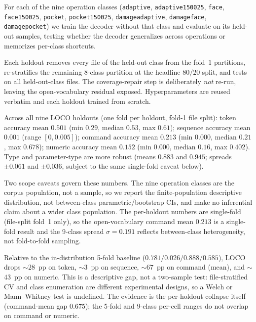 \documentclass[sensors,article,submit,moreauthors,pdftex]{Definitions/mdpi}
\begin{document}
For each of the nine operation classes (\texttt{adaptive}, \texttt{adaptive150025}, \texttt{face}, \texttt{face150025}, \texttt{pocket}, \texttt{pocket150025}, \texttt{damageadaptive}, \texttt{damageface}, \texttt{damagepocket}) we train the decoder without that class and evaluate on its held-out samples, testing whether the decoder generalizes across operations or memorizes per-class shortcuts.

Each holdout removes every file of the held-out class from the fold~1 partitions, re-stratifies the remaining $8$-class partition at the headline $80/20$ split, and tests on all held-out-class files. The coverage-repair step is deliberately \emph{not} re-run, leaving the open-vocabulary residual exposed. Hyperparameters are reused verbatim and each holdout trained from scratch.

Across all nine LOCO holdouts (one fold per holdout, fold-1 file split): token accuracy mean $0.501$ (min $0.29$, median $0.53$, max $0.61$); sequence accuracy mean $0.001$ (range $[0, 0.005]$); command accuracy mean $0.213$ (min $0.000$, median $0.21$, max $0.678$); numeric accuracy mean $0.152$ (min $0.000$, median $0.16$, max $0.402$). Type and parameter-type are more robust (means $0.883$ and $0.945$; spreads $\pm 0.061$ and $\pm 0.036$, subject to the same single-fold caveat below).

Two scope caveats govern these numbers. The nine operation classes are the corpus population, not a sample, so we report the finite-population descriptive distribution, not between-class parametric/bootstrap CIs, and make no inferential claim about a wider class population. The per-holdout numbers are single-fold (file-split fold~1 only), so the open-vocabulary command mean $0.213$ is a single-fold result and the 9-class spread $\sigma = 0.191$ reflects between-class heterogeneity, not fold-to-fold sampling.

Relative to the in-distribution 5-fold baseline ($0.781 / 0.026 / 0.888 / 0.585$), LOCO drops $\sim$$28$~pp on token, $\sim$$3$~pp on sequence, $\sim$$67$~pp on command (mean), and $\sim$$43$~pp on numeric. This is a descriptive gap, not a two-sample test: file-stratified CV and class enumeration are different experimental designs, so a Welch or Mann--Whitney test is undefined. The evidence is the per-holdout collapse itself (command-mean gap $0.675$); the 5-fold and 9-class per-cell ranges do not overlap on command or numeric.
\end{document}
